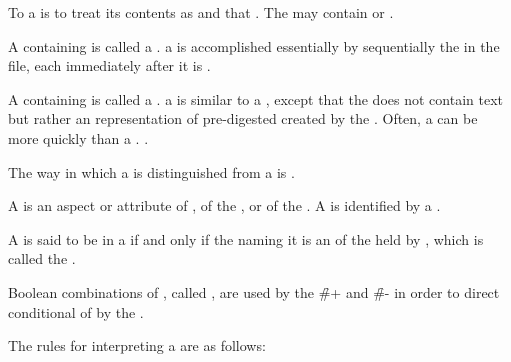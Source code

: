 

To  a  is to treat its contents as 
and  that .
The  may contain  or .

A  containing  is called a .
 a  is accomplished essentially 
by sequentially  the  in the file,
 each immediately after it is .

A  containing  is called a .
 a  is similar to  a ,
except that the  does not contain text but rather an
 representation of pre-digested 
created by the .  Often, a  can be 
more quickly than a .
\Seesection\Compilation.

The way in which a  is distinguished from a  
is .

\endsubsection%


A  is an aspect or attribute
     of \clisp, 
     of the ,
  or of the .
A  is identified by a .

A  is said to be  in a 
if and only if the  naming it is an  of the
 held by , 
which is called the .


Boolean combinations of , called ,
are used by the \f{\#+} and \f{\#-}  in order to
direct conditional  of  by the .

The rules for interpreting a  are as follows:

\beginlist


